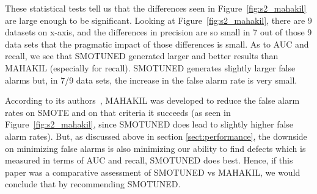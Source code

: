 \documentclass[sigconf]{acmart}
\theoremstyle{break}
\newcommand{\smb}{{\sc SMOTUNED}}
\begin{document}
These statistical tests tell us that the differences seen in Figure~\ref{fig:s2_mahakil}  are large enough to be significant. Looking at Figure~\ref{fig:s2_mahakil}, there are 9 datasets on x-axis, and the differences in precision
  are   so small
in 7 out of those 9 data sets that the pragmatic impact of those differences is small. As to AUC and recall,  we see that 
{\smb} generated   larger and better results than MAHAKIL (especially for recall). {\smb} generates slightly larger false alarms but, in 7/9 data sets,
the increase in the false alarm rate is very small.

According to its authors~\cite{bennin2017mahakil},
MAHAKIL was developed to reduce the false alarm rates on SMOTE and on that criteria it succeeds
 (as seen in  Figure~\ref{fig:s2_mahakil}, since {\smb} does lead to slightly higher false
alarm rates).   But, as discussed above in section \ref{sect:performance}, the downside on minimizing false alarms is also minimizing our ability to 
find defects which is measured in terms of AUC and recall, {\smb} does best.
  Hence,  if this paper was a comparative assessment of  {\smb} vs MAHAKIL, we would conclude that
  by recommending {\smb}.
  
\end{document}
